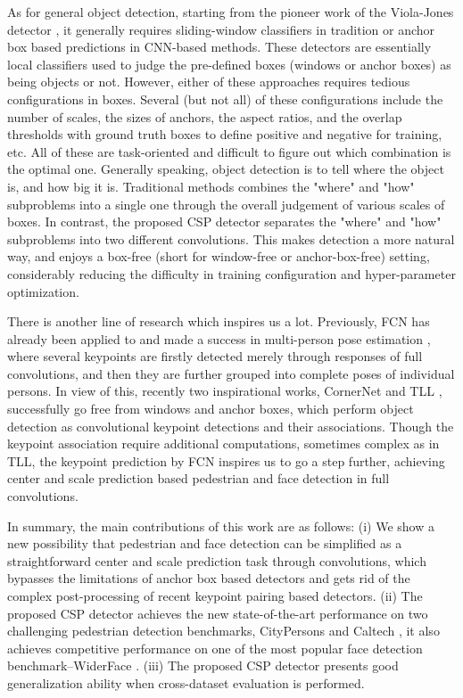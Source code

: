 As for general object detection, starting from the pioneer work of the Viola-Jones detector \cite{viola2004robust}, it generally requires sliding-window classifiers in tradition or anchor box based predictions in CNN-based methods. These detectors are essentially local classifiers used to judge the pre-defined boxes (windows or anchor boxes) as being objects or not. However, either of these approaches requires tedious configurations in boxes. Several (but not all) of these configurations include the number of scales, the sizes of anchors, the aspect ratios, and the overlap thresholds with ground truth boxes to define positive and negative for training, etc. All of these are task-oriented and difficult to figure out which combination is the optimal one. Generally speaking, object detection is to tell where the object is, and how big it is. Traditional methods combines the "where" and "how" subproblems into a single one through the overall judgement of various scales of boxes. In contrast, the proposed CSP detector separates the "where" and "how" subproblems into two different convolutions. This makes detection a more natural way, and enjoys a box-free (short for window-free or anchor-box-free) setting, considerably reducing the difficulty in training configuration and hyper-parameter optimization.

There is another line of research which inspires us a lot. Previously, FCN has already been applied to and made a success in multi-person pose estimation \cite{cao2016realtime,newell2017associative}, where several keypoints are firstly detected merely through responses of full convolutions, and then they are further grouped into complete poses of individual persons. In view of this, recently two inspirational works, CornerNet \cite{Law_2018_ECCV} and TLL \cite{Song_2018_ECCV}, successfully go free from windows and anchor boxes, which perform object detection as convolutional keypoint detections and their associations. Though the keypoint association require additional computations, sometimes complex as in TLL, the keypoint prediction by FCN inspires us to go a step further, achieving center and scale prediction based pedestrian and face detection in full convolutions.

In summary, the main contributions of this work are as follows: (i) We show a new possibility that pedestrian and face detection can be simplified as a straightforward center and scale prediction task through convolutions, which bypasses the limitations of anchor box based detectors and gets rid of the complex post-processing of recent keypoint pairing based detectors. (ii) The proposed CSP detector achieves the new state-of-the-art performance on two challenging pedestrian detection benchmarks, CityPersons \cite{zhang2017citypersons} and Caltech \cite{dollar2012pedestrian}, it also achieves competitive performance on one of the most popular face detection benchmark--WiderFace \cite{yang2016wider}.
(iii) The proposed CSP detector presents good generalization ability when cross-dataset evaluation is performed.

